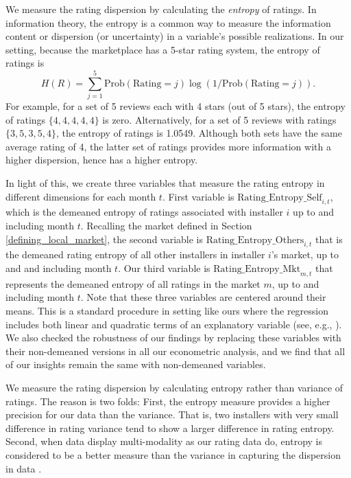 \documentclass[msom,blindrev]{informs3}
\begin{document}
	We measure the rating dispersion by calculating the \emph{entropy} of ratings. In information theory, the entropy is a common way to measure the information content or dispersion (or uncertainty) in a variable's possible realizations. In our setting, because the marketplace has a 5-star rating system, the entropy of ratings is
	\begin{equation}\label{def: entropy}
	H(R)= \sum_{j=1}^{5} \text{Prob}(\text{Rating}=j) \log(1/\text{Prob}(\text{Rating}=j)).
	\end{equation}
	For example, for a set of 5 reviews each with 4 stars (out of 5 stars), the entropy of ratings $\{4,4,4,4,4\}$ is zero. Alternatively, for a set of 5 reviews with ratings $\{3,5,3,5,4\}$, the entropy of ratings is 1.0549. Although both sets have the same average rating of 4, the latter set of ratings provides more information with a higher dispersion, hence has a higher entropy.
	
	
	In light of this, we create three variables that measure the rating entropy in different dimensions for each month $t$. First variable is $\text{Rating\_Entropy\_Self}_{i,t}$, which is the demeaned entropy of ratings associated with installer $i$ up to and including month $t$. Recalling the market defined in Section \ref{defining_local_market}, the second variable is $\text{Rating\_Entropy\_Others}_{i,t}$ that is the demeaned rating entropy of all other installers in installer $i$'s market, up to and and including month $t$. Our third variable is $\text{Rating\_Entropy\_Mkt}_{m,t}$ that represents the demeaned entropy of all ratings in the market $m$, up to and including month $t$. Note that these three variables are centered around their means. This is a standard procedure in setting like ours where the regression includes both linear and quadratic terms of an explanatory variable (see, e.g., \cite{tan2014does}). We also checked the robustness of our findings by replacing these variables with their non-demeaned versions in all our econometric analysis, and we find that all of our insights remain the same with non-demeaned variables.
	
	We measure the rating dispersion by calculating entropy rather than variance of ratings. The reason is two folds: First, the entropy measure provides a higher precision for our data than the variance. That is, two installers with very small difference in rating variance tend to show a larger difference in rating
entropy. Second, when data display multi-modality as our rating data do, entropy is considered to be a better measure than the variance in capturing the dispersion in data \citep{smaldino2013measures}.
	
\end{document}
